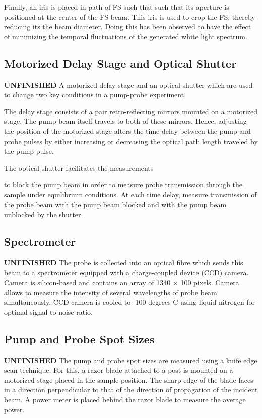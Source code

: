 Finally, an iris is  placed in path of FS such that such that its aperture is positioned at the center of the FS beam. This iris is used to crop the FS, thereby reducing its the beam diameter. Doing this has been observed to have the effect of minimizing the temporal fluctuations of the generated white light spectrum. 

\subsection{Motorized Delay Stage and Optical Shutter}

\textbf{\color{red}UNFINISHED} A motorized delay stage and an optical shutter which are used to change two key conditions in a pump-probe experiment. 

The delay stage consists of a pair retro-reflecting mirrors mounted on a motorized stage. The pump beam itself travels to both of these mirrors. Hence, adjusting the position of the motorized stage alters the time delay between the pump and probe pulses by either increasing or decreasing the optical path length traveled by the pump pulse. 

The optical shutter facilitates the measurements 

to block the pump beam in order to measure probe transmission through the sample under equilibrium conditions. At each time delay, measure transmission of the probe beam with the pump beam blocked and with the pump beam unblocked by the shutter.  



\subsection{Spectrometer}
\textbf{\color{red}UNFINISHED}
The probe is collected into an optical fibre which sends this beam to a spectrometer equipped with a charge-coupled device (CCD) camera. Camera is silicon-based and contains an array of 1340 $\times$ 100 pixels. Camera allows to measure the intensity of several wavelengths of probe beam simultaneously. CCD camera is cooled to -100 degrees C using liquid nitrogen for optimal signal-to-noise ratio. 

\subsection{Pump and Probe Spot Sizes}
\textbf{\color{red}UNFINISHED}
The pump and probe spot sizes are measured using a knife edge scan technique. For this, a razor blade attached to a post is mounted on a motorized stage placed in the sample position. The sharp edge of the blade faces in a direction perpendicular to that of the direction of propagation of the incident beam. A power meter is placed behind the razor blade to measure the average power.


